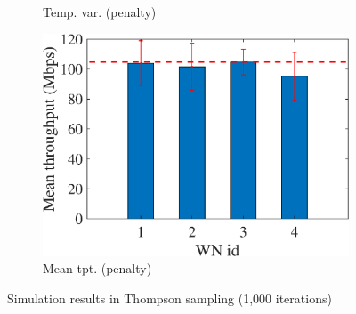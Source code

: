 \documentclass[preprint,12pt]{article}
\begin{document}
\begin{figure}[h!]
\begin{subfigure}[b]{.3\textwidth}
		\caption{Temp. var.  (penalty)}\label{fig:temporal_individual_tpt_PEG}
	\end{subfigure}
	\begin{subfigure}[b]{.3\textwidth}
		\includegraphics[width=\textwidth]{images/mean_tpt_PEG}
		\caption{Mean tpt. (penalty)}\label{fig:mean_tpt_PEG}
	\end{subfigure}
	\caption{Simulation results in Thompson sampling (1,000 iterations)}
	\label{fig:ts}
\end{figure}
\end{document}
